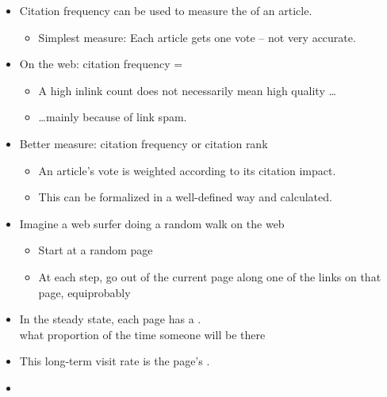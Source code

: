 \documentclass[a4paper,landscape,headrule,footrule,xetex]{foils}
\begin{document}
\begin{itemize}
\item Citation frequency can be used to measure
  the  of an article.
\begin{itemize}
\item Simplest measure: Each article gets one vote -- not
  very accurate.
\end{itemize}
\item On the web: citation frequency = 
\begin{itemize}
\item A high inlink count does not necessarily
  mean high quality \ldots
\item \ldots mainly because of link spam.
\end{itemize}
\item Better measure:  citation frequency or citation rank
\begin{itemize}
\item An article's vote is weighted according to its
  citation impact. 
\item This  can be formalized in a   well-defined way and calculated.
\end{itemize}
\end{itemize}

\begin{itemize}
\item Imagine a web surfer doing a random walk on the web
\begin{itemize}
\item Start at a random page
\item At each step, go out of the current page along one of
  the links on that page, equiprobably
\end{itemize}
\item In the steady state, each page has a .
  \\ what proportion of the time someone will be there
\item This long-term visit rate is the page's .
\item {}
\end{itemize}
\end{document}
